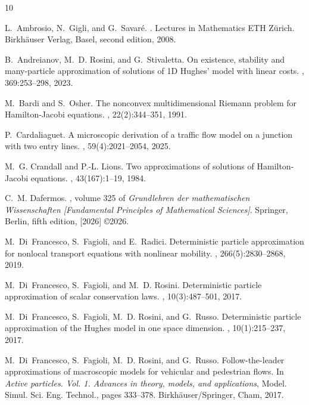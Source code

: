 \documentclass[reqno,oneside]{amsart}
\theoremstyle{plain}
\begin{document}
\begin{thebibliography}{10}

L.~Ambrosio, N.~Gigli, and G.~Savar\'e.
.
\newblock Lectures in Mathematics ETH Z\"urich. Birkh\"auser Verlag, Basel, second edition, 2008.

B.~Andreianov, M.~D. Rosini, and G.~Stivaletta.
\newblock On existence, stability and many-particle approximation of solutions of 1{D} {H}ughes' model with linear costs.
, 369:253--298, 2023.

M.~Bardi and S.~Osher.
\newblock The nonconvex multidimensional {R}iemann problem for {H}amilton-{J}acobi equations.
, 22(2):344--351, 1991.

P.~Cardaliaguet.
\newblock A microscopic derivation of a traffic flow model on a junction with two entry lines.
, 59(4):2021--2054, 2025.

M.~G. Crandall and P.-L. Lions.
\newblock Two approximations of solutions of {H}amilton-{J}acobi equations.
, 43(167):1--19, 1984.

C.~M. Dafermos.
, volume 325 of {\em Grundlehren der mathematischen Wissenschaften [Fundamental Principles of Mathematical Sciences]}.
\newblock Springer, Berlin, fifth edition, [2026] \copyright 2026.

M.~Di~Francesco, S.~Fagioli, and E.~Radici.
\newblock Deterministic particle approximation for nonlocal transport equations with nonlinear mobility.
, 266(5):2830--2868, 2019.

M.~Di~Francesco, S.~Fagioli, and M.~D. Rosini.
\newblock Deterministic particle approximation of scalar conservation laws.
, 10(3):487--501, 2017.

M.~Di~Francesco, S.~Fagioli, M.~D. Rosini, and G.~Russo.
\newblock Deterministic particle approximation of the {H}ughes model in one space dimension.
, 10(1):215--237, 2017.

M.~Di~Francesco, S.~Fagioli, M.~D. Rosini, and G.~Russo.
\newblock Follow-the-leader approximations of macroscopic models for vehicular and pedestrian flows.
\newblock In {\em Active particles. {V}ol. 1. {A}dvances in theory, models, and applications}, Model. Simul. Sci. Eng. Technol., pages 333--378. Birkh\"auser/Springer, Cham, 2017.


\end{thebibliography}
\end{document}
